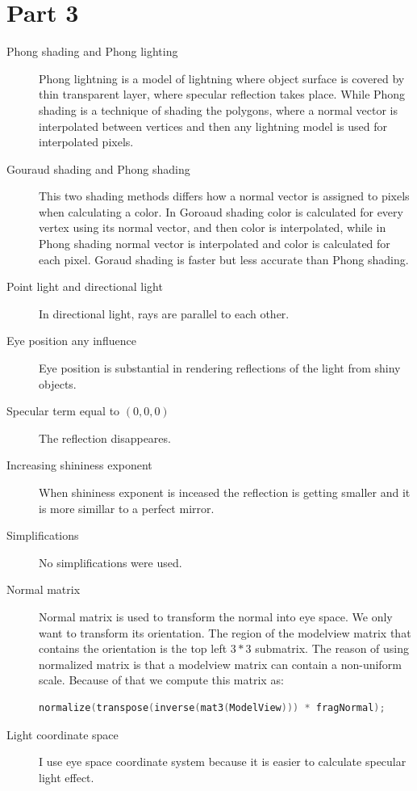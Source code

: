 \section{Part 3}
\begin{description}
\item[Phong shading and Phong lighting]
	Phong lightning is a model of lightning where object surface is covered by thin transparent layer,
	where specular reflection takes place. While Phong shading is a technique of shading the polygons,
	where a normal vector is interpolated between vertices and then any lightning model is used for 
	interpolated pixels. 
\item[Gouraud shading and Phong shading]
	This two shading methods differs how a normal vector is assigned to pixels when calculating a color.
	In Goroaud shading color is calculated for every vertex using its normal vector, and then color is
	interpolated, while in Phong shading normal vector is interpolated and color is calculated for each pixel.
	Goraud shading is faster but less accurate than Phong shading.
\item[Point light and directional light]
	In directional light, rays are parallel to each other.
\item[Eye position any influence]
	Eye position is substantial in rendering reflections of the light from shiny objects.
\item[Specular term equal to $(0,0,0)$]
	The reflection disappeares.
\item[Increasing shininess exponent]
	When shininess exponent is inceased the reflection is getting smaller and it is more simillar to a perfect mirror.
\item[Simplifications] No simplifications were used.
	
\item[Normal matrix]
	Normal matrix is used to transform the normal into eye space. We only want to transform its orientation. 
	The region of the modelview matrix that contains the orientation is the top left $3*3$ submatrix. The reason
	of using normalized matrix is that a modelview matrix can contain a non-uniform scale. Because of that we
	compute this matrix as:
	\begin{lstlisting}[language=cpp, caption={Normal matrix}]
	normalize(transpose(inverse(mat3(ModelView))) * fragNormal);
	\end{lstlisting}
\item[Light coordinate space]
	I use eye space coordinate system because it is easier to calculate specular light effect.
\end{description}
\clearpage

